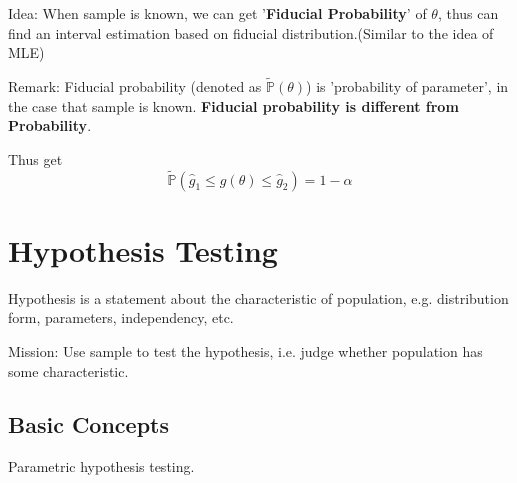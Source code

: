     Idea: When sample is known, we can get '\textbf{Fiducial Probability}' of $\theta$, thus can find an interval estimation based on fiducial distribution.(Similar to the idea of MLE)

    Remark: Fiducial probability (denoted as $\tilde{\mathbb{P}}(\theta)$) is 'probability of parameter', in the case that sample is known. \textbf{Fiducial probability is different from Probability}.

    Thus get
    \begin{equation}
        \tilde{\mathbb{P}}(\hat{g}_1\leq g(\theta)\leq \hat{g}_2)=1-\alpha
    \end{equation}







\section{Hypothesis Testing}\label{SectionHypothesisTesting}
    Hypothesis is a statement about the characteristic of population, e.g. distribution form, parameters, independency, etc. 
    
    Mission: Use sample to test the hypothesis, i.e. judge whether population has some characteristic.

\subsection{Basic Concepts}\label{SubSectionHypothesisTestingBasicConcepts}
    Parametric hypothesis testing.

